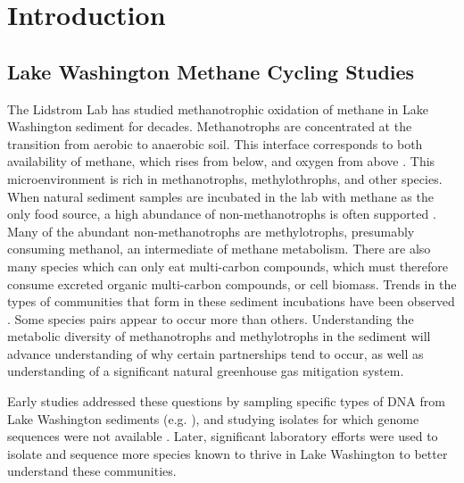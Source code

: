 
\section{Introduction}
\subsection{Lake Washington Methane Cycling Studies}

The Lidstrom Lab has studied methanotrophic oxidation of methane in Lake Washington sediment for decades.
Methanotrophs are concentrated at the transition from aerobic to anaerobic soil.
This interface corresponds to both availability of methane, which rises from below, and oxygen from above \cite{lidstrom1984gradients, kuivilal1988, auman2000gradients}. %
This microenvironment is rich in methanotrophs, methylothrophs, and other species.
When natural sediment samples are incubated in the lab with methane as the only food source, a high abundance of non-methanotrophs is often supported \cite{oshkin2015LW}.
Many of the abundant non-methanotrophs are methylotrophs, presumably consuming methanol, an intermediate of methane metabolism.
There are also many species which can only eat multi-carbon compounds, which must therefore consume excreted organic multi-carbon compounds, or cell biomass.
Trends in the types of communities that form in these sediment incubations have been observed  \cite{oshkin2015LW}.
Some species pairs appear to occur more than others.
Understanding the metabolic diversity of methanotrophs and methylotrophs in the sediment will advance understanding of why certain partnerships tend to occur, as well as understanding of a significant natural greenhouse gas mitigation system.

Early studies addressed these questions by sampling specific types of DNA from Lake Washington sediments (e.g. \cite{auman2002, costello2002, nercessian2005}), and studying isolates for which genome sequences were not available \cite{auman2000gradients, kalyuzhnaya2005Methylosarcina, kalyuzhnaya2006methylotenera}.
Later, significant laboratory efforts were used to isolate and sequence more species known to thrive in Lake Washington
    \cite{kalyuzhnaya2011isolates, beck2015isolates, mctaggart2015, kalyuzhnaya2015} to better understand these communities.


